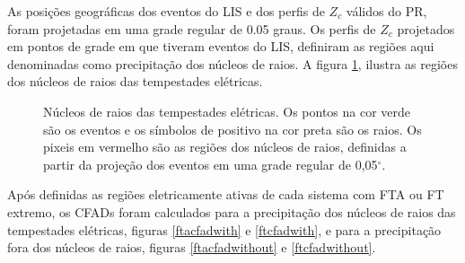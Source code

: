 As posições geográficas dos eventos do LIS e dos perfis de $Z_c$ válidos do PR, foram projetadas em uma grade regular de 0.05 graus. Os perfis de $Z_c$ projetados em pontos de grade em que tiveram eventos do LIS, definiram as regiões aqui denominadas como precipitação dos núcleos de raios. A figura \ref{nucleosRaios}, ilustra as regiões dos núcleos de raios das tempestades elétricas.


\begin{figure}[!htb]
  \caption{Núcleos de raios das tempestades elétricas. Os pontos na cor  verde são os eventos e os símbolos de positivo na cor preta são os raios. Os pixeis em vermelho são as regiões dos núcleos de raios, definidas a partir da projeção dos eventos em uma grade regular de 0,05$^{\circ}$.} %
\label{nucleosRaios}
\end{figure}



Após definidas as regiões eletricamente ativas de cada sistema com FTA ou FT extremo, os CFADs foram calculados para a precipitação dos núcleos de raios das tempestades elétricas, figuras \ref{ftacfadwith} e \ref{ftcfadwith}, e para a precipitação fora dos núcleos de raios, figuras \ref{ftacfadwithout} e \ref{ftcfadwithout}.

